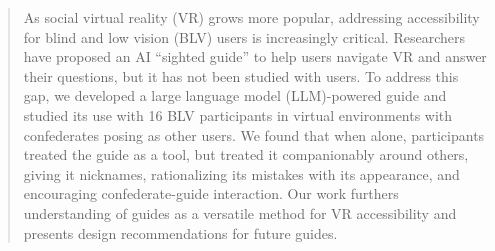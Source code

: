 \begin{abstract}
    As social virtual reality (VR) grows more popular, addressing accessibility for blind and low vision (BLV) users is increasingly critical. Researchers have proposed an AI “sighted guide” to help users navigate VR and answer their questions, but it has not been studied with users. To address this gap, we developed a large language model (LLM)-powered guide and studied its use with 16 BLV participants in virtual environments with confederates posing as other users. We found that when alone, participants treated the guide as a tool, but treated it companionably around others, giving it nicknames, rationalizing its mistakes with its appearance, and encouraging confederate-guide interaction. Our work furthers understanding of guides as a versatile method for VR accessibility and presents design recommendations for future guides.
\end{abstract}
